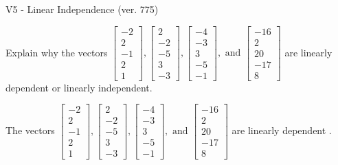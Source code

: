 \begin{exercise}
  \begin{exerciseTitle}V5 - Linear Independence (ver. 775)\end{exerciseTitle}
  \begin{exerciseStatement}
    Explain why the vectors \(\left[\begin{array}{r}
-2 \\
2 \\
-1 \\
2 \\
1
\end{array}\right] , \left[\begin{array}{r}
2 \\
-2 \\
-5 \\
3 \\
-3
\end{array}\right] , \left[\begin{array}{r}
-4 \\
-3 \\
3 \\
-5 \\
-1
\end{array}\right] , \text{ and } \left[\begin{array}{r}
-16 \\
2 \\
20 \\
-17 \\
8
\end{array}\right]\) are linearly dependent or linearly independent.	


  \end{exerciseStatement}
  \begin{exerciseAnswer}
   The vectors \(\left[\begin{array}{r}
-2 \\
2 \\
-1 \\
2 \\
1
\end{array}\right] , \left[\begin{array}{r}
2 \\
-2 \\
-5 \\
3 \\
-3
\end{array}\right] , \left[\begin{array}{r}
-4 \\
-3 \\
3 \\
-5 \\
-1
\end{array}\right] , \text{ and } \left[\begin{array}{r}
-16 \\
2 \\
20 \\
-17 \\
8
\end{array}\right]\) are 
  	 linearly dependent  .
  


  \end{exerciseAnswer}
\end{exercise}